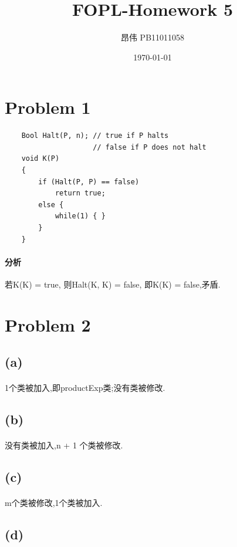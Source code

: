 \documentclass[A4paper,10pt]{paper}
\title{FOPL-Homework 5}
\author{昂伟 PB11011058}
\date{ \today }
\begin{document}
\maketitle

\section*{Problem 1}
	\begin{lstlisting}
	Bool Halt(P, n); // true if P halts
	                 // false if P does not halt
	void K(P)		 
	{ 
		if (Halt(P, P) == false) 
			return true;
		else {
			while(1) { }
		}
	}
	\end{lstlisting}
	\paragraph{分析} 若K(K) = true, 则Halt(K, K) = false, 即K(K) = false,矛盾.
	
\section*{Problem 2}
	\subsection*{(a)}
	\paragraph{} 1个类被加入,即productExp类;没有类被修改.
	
	\subsection*{(b)}
	\paragraph{} 没有类被加入,n + 1 个类被修改.
	
	\subsection*{(c)}
	\paragraph{} m个类被修改,1个类被加入.
	
	\subsection*{(d)}
\end{document}
